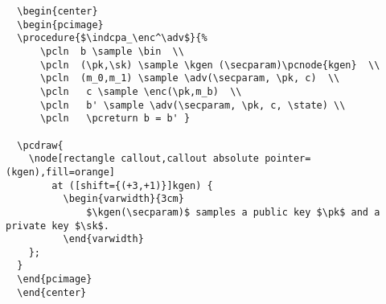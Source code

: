 \documentclass[a4paper]{report}
\begin{document}
  \begin{lstlisting}
  \begin{center}
  \begin{pcimage}
  \procedure{$\indcpa_\enc^\adv$}{%
	  \pcln  b \sample \bin  \\
	  \pcln  (\pk,\sk) \sample \kgen (\secparam)\pcnode{kgen}  \\
	  \pcln  (m_0,m_1) \sample \adv(\secparam, \pk, c)  \\
	  \pcln   c \sample \enc(\pk,m_b)  \\
	  \pcln   b' \sample \adv(\secparam, \pk, c, \state) \\
	  \pcln   \pcreturn b = b' }
  
  \pcdraw{
	\node[rectangle callout,callout absolute pointer=(kgen),fill=orange]
		at ([shift={(+3,+1)}]kgen) {
		  \begin{varwidth}{3cm}
			  $\kgen(\secparam)$ samples a public key $\pk$ and a private key $\sk$.
		  \end{varwidth}
	};
  }
  \end{pcimage}
  \end{center}
  \end{lstlisting}
  
  
\end{document}
